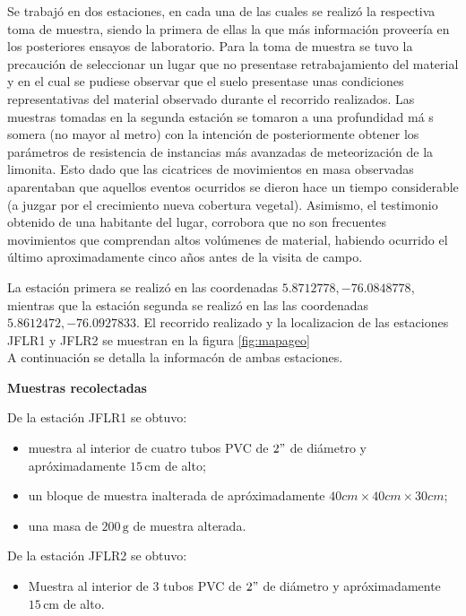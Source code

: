 Se trabaj\'o en dos estaciones, en cada una de las cuales se realiz\'o la respectiva toma de muestra, siendo la primera de ellas la que m\'as informaci\'on proveer\'ia en los posteriores ensayos de laboratorio. Para la toma de muestra se tuvo la precauci\'on de seleccionar un lugar que no presentase retrabajamiento del material y en el cual se pudiese observar que el suelo presentase unas condiciones representativas del material observado durante el recorrido realizados.
Las muestras tomadas en la segunda estaci\'on se tomaron a una profundidad m\'a s somera (no mayor al metro) con la intenci\'on de posteriormente obtener los par\'ametros de resistencia de instancias m\'as avanzadas de meteorizaci\'on de la limonita. Esto dado que las cicatrices de movimientos en masa observadas aparentaban que aquellos eventos ocurridos se dieron hace un tiempo considerable (a juzgar por el crecimiento nueva cobertura vegetal). Asimismo, el testimonio obtenido de una habitante del lugar, corrobora que no son frecuentes movimientos que comprendan altos vol\'umenes de material, habiendo ocurrido el \'ultimo aproximadamente cinco a\~nos antes de la visita de campo.

La estaci\'on primera se realiz\'o en las coordenadas \(5.8712778, -76.0848778\), mientras que la estaci\'on segunda se realiz\'o en las las coordenadas \(5.8612472,-76.0927833\). El recorrido realizado y la localizacion de las estaciones JFLR1 y JFLR2 se muestran en la figura \ref{fig:mapageo}\\
A continuaci\'on se detalla la informac\'on de ambas estaciones.

\textbf{Muestras recolectadas}

De la estaci\'on JFLR1 se obtuvo:
\begin{itemize}
  \item muestra al interior de cuatro tubos PVC de \(2"\) de di\'ametro y apr\'oximadamente \(15\,\text{cm}\) de alto;
  \item un bloque de muestra inalterada  de apr\'oximadamente \(40cm \times 40cm \times 30cm\);
  \item una masa de \(200\,\text{g}\) de muestra alterada.
\end{itemize}

De la estaci\'on JFLR2 se obtuvo:
\begin{itemize}
  \item Muestra al interior de 3 tubos PVC de \(2"\) de di\'ametro y apr\'oximadamente \(15\,\text{cm}\) de alto.
\end{itemize}

